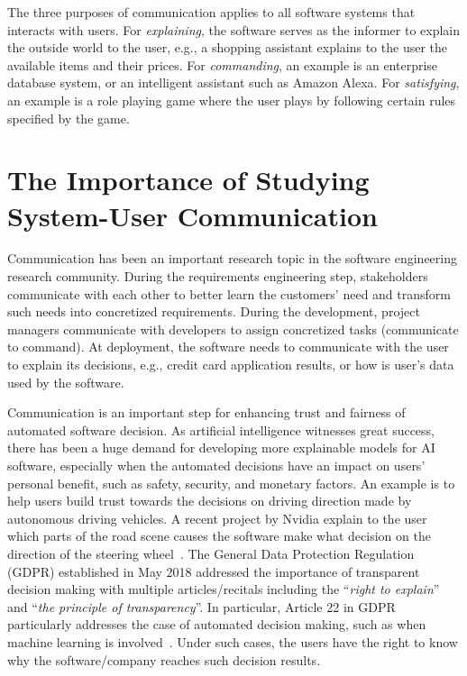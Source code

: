 The three purposes of communication applies to all software systems that interacts with users. For \textit{explaining}, the software serves as the informer to explain the outside world to the user, e.g., a shopping assistant explains to the user the available items and their prices. For \textit{commanding}, an example is an enterprise database system, or an intelligent assistant such as Amazon Alexa. For \textit{satisfying}, an example is a role playing game where the user plays by following certain rules specified by the game. 

\section{The Importance of Studying System-User Communication}

Communication has been an important research topic in the software engineering research community. During the requirements engineering step, stakeholders communicate with each other to better learn the customers' need and transform such needs into concretized requirements. During the development, project managers communicate with developers to assign concretized tasks (communicate to command). At deployment, the software needs to communicate with the user to explain its decisions, e.g., credit card application results, or how is user's data used by the software. 

Communication is an important step for enhancing trust and fairness of automated software decision. As artificial intelligence witnesses great success, there has been a huge demand for developing more explainable models for AI software, especially when the automated decisions have an impact on users' personal benefit, such as safety, security, and monetary factors. An example is to help users build trust towards the decisions on driving direction made by autonomous driving vehicles. A recent project by Nvidia explain to the user which parts of the road scene causes the software make what decision on the direction of the steering wheel~\cite{explainableautonomousdriving}. The General Data Protection Regulation (GDPR) established in May 2018 addressed the importance of transparent decision making with multiple articles/recitals including the ``\textit{right to explain}'' and ``\textit{the principle of transparency}''. In particular, Article 22 in GDPR particularly addresses the case of automated decision making, such as when machine learning is involved~\cite{automateddecision}. Under such cases, the users have the right to know why the software/company reaches such decision results. 

